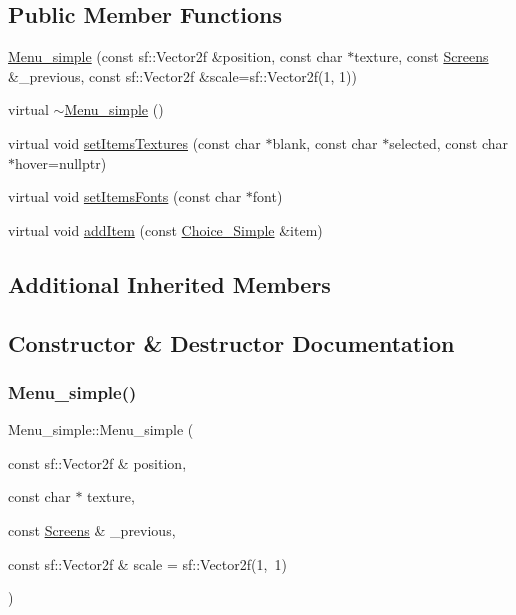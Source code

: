 \subsection*{Public Member Functions}
\begin{DoxyCompactItemize}
\item 
\hyperlink{class_menu__simple_aa85e31333052b51c3d138ec0689630c2}{Menu\+\_\+simple} (const sf\+::\+Vector2f \&position, const char $\ast$texture, const \hyperlink{_globals_8h_a3d5776bab98402b03be09156bacf4f68}{Screens} \&\+\_\+previous, const sf\+::\+Vector2f \&scale=sf\+::\+Vector2f(1, 1))
\item 
virtual \hyperlink{class_menu__simple_a82cb459eae7f0c28d2576ead6430fe52}{$\sim$\+Menu\+\_\+simple} ()
\item 
virtual void \hyperlink{class_menu__simple_a4717470decb5666cbac7aa879aade5fa}{set\+Items\+Textures} (const char $\ast$blank, const char $\ast$selected, const char $\ast$hover=nullptr)
\item 
virtual void \hyperlink{class_menu__simple_a1273e6743ee892cd8651968efd595b73}{set\+Items\+Fonts} (const char $\ast$font)
\item 
virtual void \hyperlink{class_menu__simple_a0fc5b4ec10c844f34495364f70cd333e}{add\+Item} (const \hyperlink{class_choice___simple}{Choice\+\_\+\+Simple} \&item)
\end{DoxyCompactItemize}
\subsection*{Additional Inherited Members}


\subsection{Constructor \& Destructor Documentation}
\mbox{\label{class_menu__simple_aa85e31333052b51c3d138ec0689630c2}} 
\subsubsection{\texorpdfstring{Menu\+\_\+simple()}{Menu\_simple()}}
{\footnotesize\ttfamily Menu\+\_\+simple\+::\+Menu\+\_\+simple (\begin{DoxyParamCaption}\item[{const sf\+::\+Vector2f \&}]{position,  }\item[{const char $\ast$}]{texture,  }\item[{const \hyperlink{_globals_8h_a3d5776bab98402b03be09156bacf4f68}{Screens} \&}]{\+\_\+previous,  }\item[{const sf\+::\+Vector2f \&}]{scale = {\ttfamily sf\+:\+:Vector2f(1,~1)} }\end{DoxyParamCaption})}

